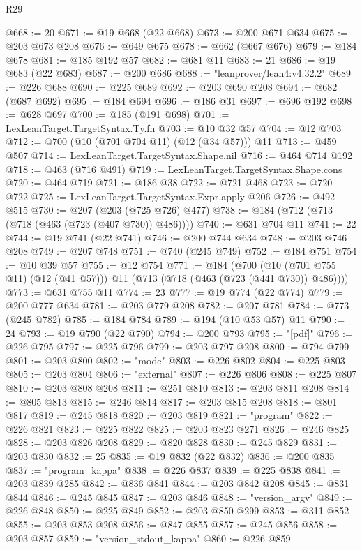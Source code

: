 \begin{lexlean}{R29}
\begin{coremodule}
@668 := 20
@671 := @19 @668 (@22 @668)
@673 := @200 @671 @634
@675 := @203 @673 @208
@676 := @649 @675
@678 := @662 (@667 @676)
@679 := @184 @678
@681 := @185 @192 @57
@682 := @681 @11
@683 := 21
@686 := @19 @683 (@22 @683)
@687 := @200 @686
@688 := "leanprover/lean4:v4.32.2"
@689 := @226 @688
@690 := @225 @689
@692 := @203 @690 @208
@694 := @682 (@687 @692)
@695 := @184 @694
@696 := @186 @31
@697 := @696 @192
@698 := @628 @697
@700 := @185 (@191 @698)
@701 := LexLeanTarget.TargetSyntax.Ty.fn
@703 := @10 @32 @57
@704 := @12 @703
@712 := @700 (@10 (@701 @704 @11) (@12 (@34 @57))) @11
@713 := @459 @507
@714 := LexLeanTarget.TargetSyntax.Shape.nil
@716 := @464 @714 @192
@718 := @463 (@716 @491)
@719 := LexLeanTarget.TargetSyntax.Shape.cons
@720 := @464 @719
@721 := @186 @38
@722 := @721 @468
@723 := @720 @722
@725 := LexLeanTarget.TargetSyntax.Expr.apply @206
@726 := @492 @515
@730 := @207 (@203 (@725 @726) @477)
@738 := @184 (@712 (@713 (@718 (@463 (@723 (@407 @730)) @486))))
@740 := @631 @704 @11
@741 := 22
@744 := @19 @741 (@22 @741)
@746 := @200 @744 @634
@748 := @203 @746 @208
@749 := @207 @748
@751 := @740 (@245 @749)
@752 := @184 @751
@754 := @10 @39 @57
@755 := @12 @754
@771 := @184
    (@700 (@10 (@701 @755 @11) (@12 (@41 @57))) @11 (@713 (@718 (@463 (@723 (@441 @730)) @486))))
@773 := @631 @755 @11
@774 := 23
@777 := @19 @774 (@22 @774)
@779 := @200 @777 @634
@781 := @203 @779 @208
@782 := @207 @781
@784 := @773 (@245 @782)
@785 := @184 @784
@789 := @194 (@10 @53 @57) @11
@790 := 24
@793 := @19 @790 (@22 @790)
@794 := @200 @793
@795 := "[pdf]"
@796 := @226 @795
@797 := @225 @796
@799 := @203 @797 @208
@800 := @794 @799
@801 := @203 @800
@802 := "mode"
@803 := @226 @802
@804 := @225 @803
@805 := @203 @804
@806 := "external"
@807 := @226 @806
@808 := @225 @807
@810 := @203 @808 @208
@811 := @251 @810
@813 := @203 @811 @208
@814 := @805 @813
@815 := @246 @814
@817 := @203 @815 @208
@818 := @801 @817
@819 := @245 @818
@820 := @203 @819
@821 := "program"
@822 := @226 @821
@823 := @225 @822
@825 := @203 @823 @271
@826 := @246 @825
@828 := @203 @826 @208
@829 := @820 @828
@830 := @245 @829
@831 := @203 @830
@832 := 25
@835 := @19 @832 (@22 @832)
@836 := @200 @835
@837 := "program_kappa"
@838 := @226 @837
@839 := @225 @838
@841 := @203 @839 @285
@842 := @836 @841
@844 := @203 @842 @208
@845 := @831 @844
@846 := @245 @845
@847 := @203 @846
@848 := "version_argv"
@849 := @226 @848
@850 := @225 @849
@852 := @203 @850 @299
@853 := @311 @852
@855 := @203 @853 @208
@856 := @847 @855
@857 := @245 @856
@858 := @203 @857
@859 := "version_stdout_kappa"
@860 := @226 @859

\end{coremodule}
\end{lexlean}
